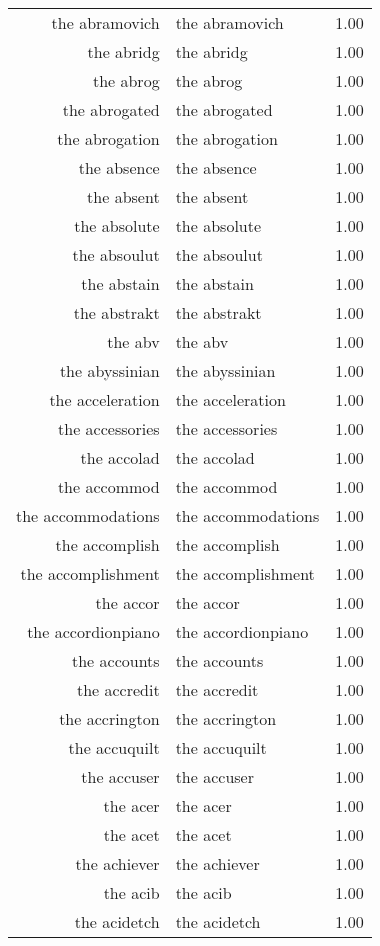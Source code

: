 \begin{table}[ht]
\begin{tabular}{rlr}
  the abramovich & the abramovich & 1.00 \\ 
  the abridg & the abridg & 1.00 \\ 
  the abrog & the abrog & 1.00 \\ 
  the abrogated & the abrogated & 1.00 \\ 
  the abrogation & the abrogation & 1.00 \\ 
  the absence & the absence & 1.00 \\ 
  the absent & the absent & 1.00 \\ 
  the absolute & the absolute & 1.00 \\ 
  the absoulut & the absoulut & 1.00 \\ 
  the abstain & the abstain & 1.00 \\ 
  the abstrakt & the abstrakt & 1.00 \\ 
  the abv & the abv & 1.00 \\ 
  the abyssinian & the abyssinian & 1.00 \\ 
  the acceleration & the acceleration & 1.00 \\ 
  the accessories & the accessories & 1.00 \\ 
  the accolad & the accolad & 1.00 \\ 
  the accommod & the accommod & 1.00 \\ 
  the accommodations & the accommodations & 1.00 \\ 
  the accomplish & the accomplish & 1.00 \\ 
  the accomplishment & the accomplishment & 1.00 \\ 
  the accor & the accor & 1.00 \\ 
  the accordionpiano & the accordionpiano & 1.00 \\ 
  the accounts & the accounts & 1.00 \\ 
  the accredit & the accredit & 1.00 \\ 
  the accrington & the accrington & 1.00 \\ 
  the accuquilt & the accuquilt & 1.00 \\ 
  the accuser & the accuser & 1.00 \\ 
  the acer & the acer & 1.00 \\ 
  the acet & the acet & 1.00 \\ 
  the achiever & the achiever & 1.00 \\ 
  the acib & the acib & 1.00 \\ 
  the acidetch & the acidetch & 1.00 \\ 

\end{tabular}
\end{table}
